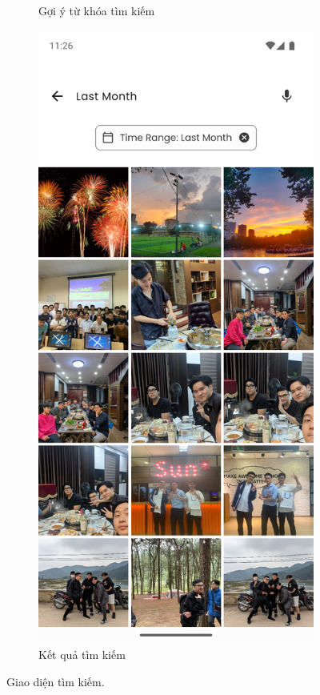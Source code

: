 \begin{figure}[H]
\begin{subfigure}{0.32\textwidth}
        \caption{Gợi ý từ khóa tìm kiếm}
    \end{subfigure}
    \begin{subfigure}{0.32\textwidth}
        \includegraphics[width=1\linewidth]{figures/c4/4-2/search_4.png} 
        \caption{Kết quả tìm kiếm}
    \end{subfigure}
    \caption{Giao diện tìm kiếm.}
    \label{fig:search-screen}
\end{figure}

